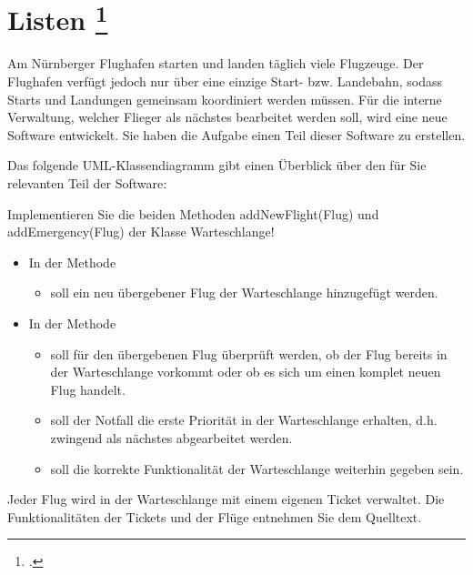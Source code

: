 \documentclass{lehramt-informatik-aufgabe}
\begin{document}

\section{Listen
\footcite[Aufgabe 3]{aud:e-klausur}}

Am Nürnberger Flughafen starten und landen täglich viele Flugzeuge. Der
Flughafen verfügt jedoch nur über eine einzige Start- bzw. Landebahn,
sodass Starts und Landungen gemeinsam koordiniert werden müssen. Für die
interne Verwaltung, welcher Flieger als nächstes bearbeitet werden soll,
wird eine neue Software entwickelt. Sie haben die Aufgabe einen Teil
dieser Software zu erstellen.

Das folgende UML-Klassendiagramm gibt einen Überblick über den für Sie
relevanten Teil der Software:

Implementieren Sie die beiden Methoden addNewFlight(Flug) und
addEmergency(Flug) der Klasse Warteschlange!

\begin{itemize}
\item In der Methode 

\begin{itemize}
\item soll ein neu übergebener Flug der Warteschlange hinzugefügt werden.
\end{itemize}

\item In der Methode 

\begin{itemize}
\item soll für den übergebenen Flug überprüft werden, ob der Flug
bereits in der Warteschlange vorkommt oder ob es sich um einen komplet
neuen Flug handelt.

\item soll der Notfall die erste Priorität in der Warteschlange
erhalten, d.h. zwingend als nächstes abgearbeitet werden.

\item soll die korrekte Funktionalität der Warteschlange weiterhin
gegeben sein.
\end{itemize}
\end{itemize}

Jeder Flug wird in der Warteschlange mit einem eigenen Ticket verwaltet.
Die Funktionalitäten der Tickets und der Flüge entnehmen Sie dem
Quelltext.

\begin{liAntwort}





\end{liAntwort}
\end{document}
